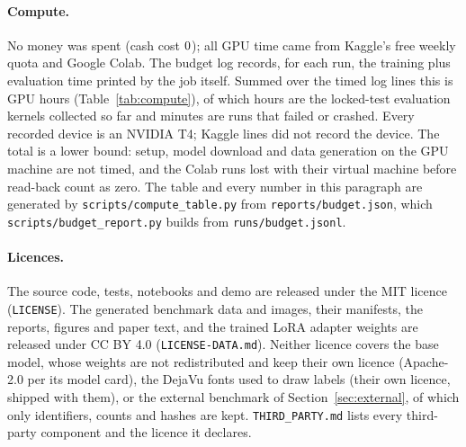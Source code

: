 \paragraph{Compute.} No money was spent (cash cost $0$); all GPU time came from Kaggle's
free weekly quota and Google Colab. The budget log records, for each run, the training plus evaluation
time printed by the job itself. Summed over the \computeMeasuredRuns{} timed log lines this is
\computeMeasuredHours{} GPU hours (Table~\ref{tab:compute}), of which \computeFinalHours{} hours are the
\computeFinalKernels{} locked-test evaluation kernels collected so far and \computeFailedMinutes{} minutes
are \computeFailedRuns{} runs that failed or crashed. Every recorded device is an NVIDIA T4;
\computeDeviceUnrecorded{} Kaggle lines did not record the device. The total is a lower bound: setup,
model download and data generation on the GPU machine are not timed, and the
\computeUnmeasuredRuns{} Colab runs lost with their virtual machine before read-back count as zero.
The table and every number in this paragraph are generated by \texttt{scripts/compute\_table.py} from
\texttt{reports/budget.json}, which \texttt{scripts/budget\_report.py} builds from \texttt{runs/budget.jsonl}.

\begin{table}[h]
\centering\small
\computeTable
\caption{Measured GPU time by purpose and by platform, from the budget log. Lines not timed are runs
lost before read-back and placeholder lines written at launch; both count as zero.}
\label{tab:compute}
\end{table}

\paragraph{Licences.} The source code, tests, notebooks and demo are released under the
MIT licence (\texttt{LICENSE}). The generated benchmark data and images,
their manifests, the reports, figures and paper text, and the trained LoRA adapter weights are released under
CC BY 4.0 (\texttt{LICENSE-DATA.md}). Neither licence covers the base model, whose weights are not
redistributed and keep their own licence (Apache-2.0 per its model card), the DejaVu fonts used to draw labels
(their own licence, shipped with them), or the external benchmark of Section~\ref{sec:external}, of which only
identifiers, counts and hashes are kept. \texttt{THIRD\_PARTY.md} lists every third-party component and the
licence it declares.
